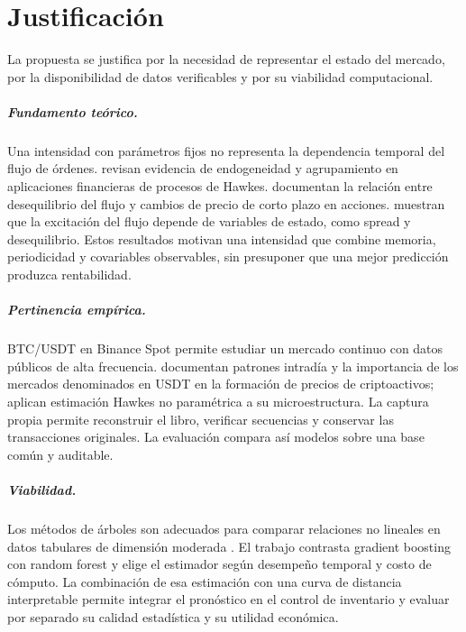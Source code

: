 \chapter{Justificación}

La propuesta se justifica por la necesidad de representar el estado del mercado, por la disponibilidad de datos verificables y por su viabilidad computacional.

\paragraph{Fundamento teórico.} Una intensidad con parámetros fijos no representa la dependencia temporal del flujo de órdenes. \citet{BacryHawkes2015} revisan evidencia de endogeneidad y agrupamiento en aplicaciones financieras de procesos de Hawkes. \citet{ContKukanovStoikov2014} documentan la relación entre desequilibrio del flujo y cambios de precio de corto plazo en acciones. \citet{MorariuPatrichiPakkanen2022} muestran que la excitación del flujo depende de variables de estado, como spread y desequilibrio. Estos resultados motivan una intensidad que combine memoria, periodicidad y covariables observables, sin presuponer que una mejor predicción produzca rentabilidad.

\paragraph{Pertinencia empírica.} BTC/USDT en Binance Spot permite estudiar un mercado continuo con datos públicos de alta frecuencia. \citet{BarucciEtAl2022} documentan patrones intradía y la importancia de los mercados denominados en USDT en la formación de precios de criptoactivos; \citet{FabreToke2025} aplican estimación Hawkes no paramétrica a su microestructura. La captura propia permite reconstruir el libro, verificar secuencias y conservar las transacciones originales. La evaluación compara así modelos sobre una base común y auditable.

\paragraph{Viabilidad.} Los métodos de árboles son adecuados para comparar relaciones no lineales en datos tabulares de dimensión moderada \citep{GrinsztajnEtAl2022}. El trabajo contrasta gradient boosting con random forest y elige el estimador según desempeño temporal y costo de cómputo. La combinación de esa estimación con una curva de distancia interpretable permite integrar el pronóstico en el control de inventario y evaluar por separado su calidad estadística y su utilidad económica.
